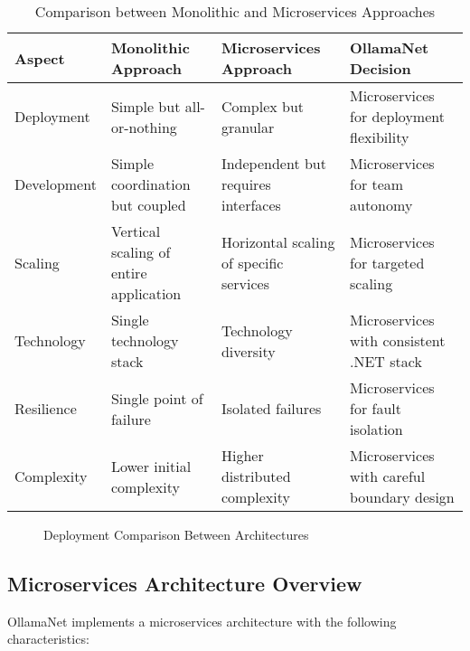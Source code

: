 \begin{table}[h]
  \centering
  \caption{Comparison between Monolithic and Microservices Approaches}
  \label{tab:mono-vs-micro}
  \begin{tabular}{|l|p{3.5cm}|p{3.5cm}|p{3.5cm}|}
    \hline
    \textbf{Aspect} & \textbf{Monolithic Approach} & \textbf{Microservices Approach} & \textbf{OllamaNet Decision} \\
    \hline
    Deployment & Simple but all-or-nothing & Complex but granular & Microservices for deployment flexibility \\
    \hline
    Development & Simple coordination but coupled & Independent but requires interfaces & Microservices for team autonomy \\
    \hline
    Scaling & Vertical scaling of entire application & Horizontal scaling of specific services & Microservices for targeted scaling \\
    \hline
    Technology & Single technology stack & Technology diversity & Microservices with consistent .NET stack \\
    \hline
    Resilience & Single point of failure & Isolated failures & Microservices for fault isolation \\
    \hline
    Complexity & Lower initial complexity & Higher distributed complexity & Microservices with careful boundary design \\
    \hline
  \end{tabular}
\end{table}

\begin{figure}
    \centering
    \caption{Deployment Comparison Between Architectures}
    \label{fig:deploy-comparison}
\end{figure}

\subsection{Microservices Architecture Overview}

OllamaNet implements a microservices architecture with the following characteristics:

